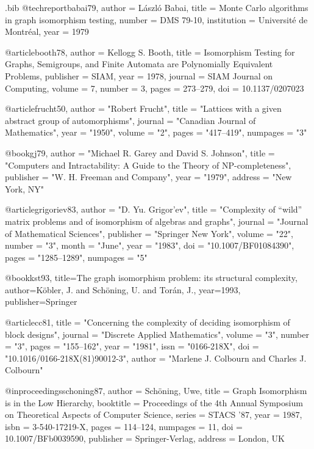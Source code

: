 \begin{filecontents*}{\jobname.bib}
@techreport{babai79,
 author = {L\'{a}szl\'{o} Babai},
 title = {Monte Carlo algorithms in graph isomorphism testing},
 number = {DMS 79-10},
 institution = {Universit\'{e} de Montr\'{e}al},
 year = {1979}
}

@article{booth78,
 author = {Kellogg S. Booth},
 title = {Isomorphism Testing for Graphs, Semigroups, and Finite Automata are
                  Polynomially Equivalent Problems},
 publisher = {SIAM},
 year = {1978},
 journal = {SIAM Journal on Computing},
 volume = {7},
 number = {3},
 pages = {273--279},
 doi = {10.1137/0207023}
}

@article{frucht50,
 author = "Robert Frucht",
 title = "Lattices with a given abstract group of automorphisms",
 journal = "Canadian Journal of Mathematics",
 year = "1950",
 volume = "2",
 pages = "417--419",
 numpages = "3"
}

@book{gj79,
 author = "Michael R. Garey and David S. Johnson",
 title = "Computers and Intractability: A Guide to the Theory of
                  NP-completeness",
 publisher = "W. H. Freeman and Company",
 year = "1979",
 address = "New York, NY"
}

@article{grigoriev83,
 author = "D. Yu. Grigor'ev",
 title = "Complexity of ``wild'' matrix problems and of isomorphism of algebras
                  and graphs",
 journal = "Journal of Mathematical Sciences",
 publisher = "Springer New York",
 volume = "22",
 number = "3",
 month = "June",
 year = "1983",
 doi = "10.1007/BF01084390",
 pages = "1285--1289",
 numpages = "5"
}

@book{kst93,
  title={The graph isomorphism problem: its structural complexity},
  author={K\"{o}bler, J. and Sch\"{o}ning, U. and Tor\'{a}n, J.},
  year={1993},
  publisher={Springer}
}

@article{cc81,
 title = "Concerning the complexity of deciding isomorphism of block designs",
 journal = "Discrete Applied Mathematics",
 volume = "3",
 number = "3",
 pages = "155--162",
 year = "1981",
 issn = "0166-218X",
 doi = "10.1016/0166-218X(81)90012-3",
 author = "Marlene J. Colbourn and Charles J. Colbourn"
}

@inproceedings{schoning87,
 author = {Sch\"{o}ning, Uwe},
 title = {Graph Isomorphism is in the Low Hierarchy},
 booktitle = {Proceedings of the 4th Annual Symposium on Theoretical Aspects of
 Computer Science},
 series = {STACS '87},
 year = {1987},
 isbn = {3-540-17219-X},
 pages = {114--124},
 numpages = {11},
 doi = {10.1007/BFb0039590},
 publisher = {Springer-Verlag},
 address = {London, UK}
}


\end{filecontents*}
